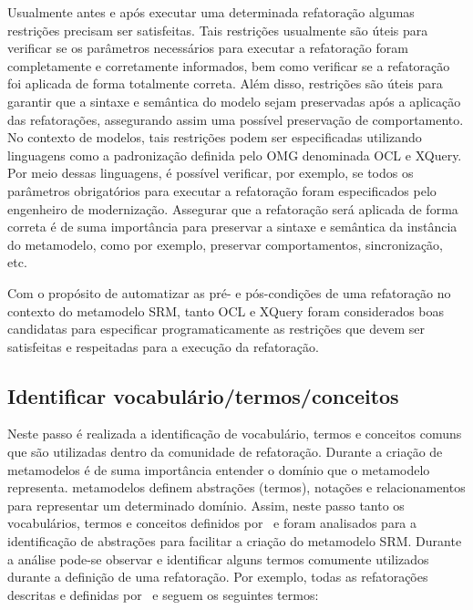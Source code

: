 Usualmente antes e após executar uma determinada refatoração algumas restrições precisam ser satisfeitas. Tais restrições usualmente são úteis para verificar se os parâmetros necessários para executar a refatoração foram completamente e corretamente informados, bem como verificar se a refatoração foi aplicada de forma totalmente correta. Além disso, restrições são úteis para garantir que a sintaxe e semântica do modelo sejam preservadas após a aplicação das refatorações, assegurando assim uma possível preservação de comportamento. No contexto de modelos, tais restrições podem ser especificadas utilizando linguagens como a padronização definida pelo OMG denominada OCL e XQuery. Por meio dessas linguagens, é possível verificar, por exemplo, se todos os parâmetros obrigatórios para executar a refatoração foram especificados pelo engenheiro de modernização. Assegurar que a refatoração será aplicada de forma correta é de suma importância para preservar a sintaxe e semântica da instância do metamodelo, como por exemplo, preservar comportamentos, sincronização, etc. 

Com o propósito de automatizar as pré- e pós-condições de uma refatoração no contexto do metamodelo SRM, tanto OCL e XQuery foram considerados boas candidatas para especificar programaticamente as restrições que devem ser satisfeitas e respeitadas para a execução da refatoração.




\subsection{Identificar vocabulário/termos/conceitos}

Neste passo é realizada a identificação de vocabulário, termos e conceitos comuns que são utilizadas dentro da comunidade de refatoração. Durante a criação de metamodelos é de suma importância entender o domínio que o metamodelo representa. metamodelos definem abstrações (termos), notações e relacionamentos para representar um determinado domínio. Assim, neste passo tanto os vocabulários, termos e conceitos definidos por~ e  foram analisados para a identificação de abstrações para facilitar a criação do metamodelo SRM. Durante a análise pode-se observar e identificar alguns termos comumente utilizados durante a definição de uma refatoração. Por exemplo, todas as refatorações descritas e definidas por~ e  seguem os seguintes termos: 

